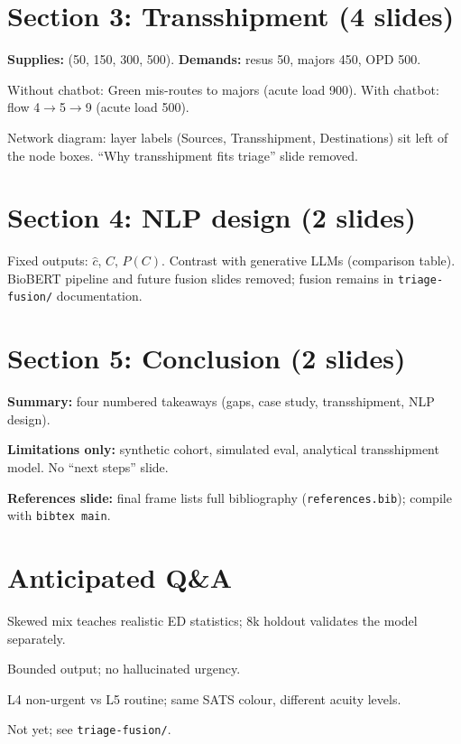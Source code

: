 \documentclass[11pt,a4paper]{article}
\begin{document}
\section{Section 3: Transshipment (4 slides)}

\textbf{Supplies:} (50, 150, 300, 500). \textbf{Demands:} resus 50, majors 450, OPD 500.

Without chatbot: Green mis-routes to majors (acute load 900). With chatbot: flow 4$\to$5$\to$9 (acute load 500).

Network diagram: layer labels (Sources, Transshipment, Destinations) sit left of the node boxes. ``Why transshipment fits triage'' slide removed.

\section{Section 4: NLP design (2 slides)}

Fixed outputs: $\hat{c}$, $C$, $P(C)$. Contrast with generative LLMs (comparison table). BioBERT pipeline and future fusion slides removed; fusion remains in \texttt{triage-fusion/} documentation.

\section{Section 5: Conclusion (2 slides)}

\textbf{Summary:} four numbered takeaways (gaps, case study, transshipment, NLP design).

\textbf{Limitations only:} synthetic cohort, simulated eval, analytical transshipment model. No ``next steps'' slide.

\textbf{References slide:} final frame lists full bibliography (\texttt{references.bib}); compile with \texttt{bibtex main}.

\section{Anticipated Q\&A}

\begin{description}[style=nextline]
  \item[Why synthetic data?] Skewed mix teaches realistic ED statistics; 8k holdout validates the model separately.
  \item[Why not ChatGPT?] Bounded output; no hallucinated urgency.
  \item[Why two greens on chart?] L4 non-urgent vs L5 routine; same SATS colour, different acuity levels.
  \item[Is TEWS included?] Not yet; see \texttt{triage-fusion/}.
\end{description}
\end{document}

